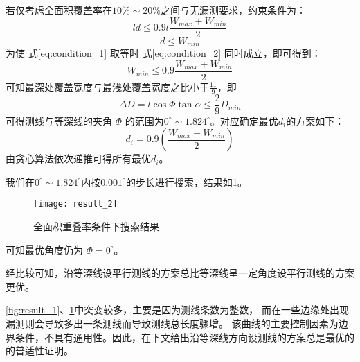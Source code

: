 \documentclass[withoutpreface,bwprint]{cumcmthesis} %
\begin{document}
        若仅考虑全面积覆盖率在$10\% \sim 20\%$之间与无漏测要求，约束条件为：
        \begin{equation}
            ld \leq 0.9 l\frac{W_{max}+W_{min}}{2}
            \label{eq:condition_1}
        \end{equation}
        \begin{equation}
            d \leq W_{min}
            \label{eq:condition_2}
        \end{equation}
        为使 式\cref{eq:condition_1} 取等时 式\cref{eq:condition_2} 同时成立，即可得到：
        \begin{equation}
            W_{min} \leq 0.9 \frac{W_{max} + W_{min}}{2}
            \label{eq:target_1}
        \end{equation}
        可知最深处覆盖宽度与最浅处覆盖宽度之比小于$\frac{11}{9}$，即
        \begin{equation}
            \Delta D = l\cos\Phi\tan\alpha \leq \frac{2}{9}D_{min}
            \label{Delta_D2}
        \end{equation}
        可得测线与等深线的夹角 $\Phi$ 的范围为$0^\circ \sim 1.824^\circ$。对应确定最优$d_i$的方案如下：
        \begin{equation}
            d_i = 0.9(\frac{W_{max} + W_{min}}{2})
            \label{eq:solve_di}
        \end{equation}
        由贪心算法依次递推可得所有最优$d_i$。

        我们在$0^\circ \sim 1.824^\circ$内按$0.001^\circ$的步长进行搜索，结果如\cref{fig:result_2}。
        \begin{figure}[H]
            \centering
            \texttt{[image: result\_2]}
            \caption{全面积重叠率条件下搜索结果}
            \label{fig:result_2}
        \end{figure}
        可知最优角度仍为 $\Phi = 0^\circ$。

        经比较可知，沿等深线设平行测线的方案总比等深线呈一定角度设平行测线的方案更优。

        \cref{fig:result_1}、\cref{fig:result_2}中突变较多，主要是因为测线条数为整数，
        而在一些边缘处出现漏测则会导致多出一条测线而导致测线总长度骤增。
        该曲线的主要控制因素为边界条件，不具有通用性。因此，在下文给出沿等深线方向设测线的方案总是最优的的普适性证明。

    
\end{document}
